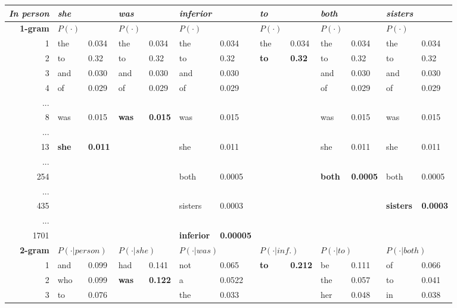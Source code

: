 \documentclass[11pt,titlepage]{article}
\begin{document}
\begin{table}
\begin{tabular}{|rllllllllllll|}
\hline
\textit{In person} & \textit{she} & & \textit{was} & & \textit{inferior} & & \textit{to} & & \textit{both} & & \textit{sisters} & \\
\hline
\textbf{1-gram} & $P(\cdot)$ & & $P(\cdot)$ & & $P(\cdot)$ & & $P(\cdot)$ & & $P(\cdot)$ & & $P(\cdot)$ & \\
1 & the & 0.034 & the & 0.034 & the & 0.034 & the & 0.034 & the & 0.034 & the & 0.034 \\
2 & to & 0.32 & to & 0.32 & to & 0.32 & \textbf{to} & \textbf{0.32} & to & 0.32 & to & 0.32 \\
3 & and & 0.030 & and & 0.030 & and & 0.030 & & & and & 0.030 & and & 0.030 \\
4 & of & 0.029 & of & 0.029 & of & 0.029 & &  & of & 0.029 & of & 0.029 \\
... & & & & & & & & & & & & \\
8 & was & 0.015  & \textbf{was} & \textbf{0.015}  & was & 0.015  & & & was & 0.015  & was & 0.015  \\
... & & & & & & & & & & & & \\
13 & \textbf{she} & \textbf{0.011} & & & she & 0.011 & & & she & 0.011 & she & 0.011 \\
... & & & & & & & & & & & & \\
254 & & & & & both & 0.0005 & & & \textbf{both} & \textbf{0.0005}  & both & 0.0005 \\
... & & & & & & & & & & & & \\ 
435 & & & & & sisters & 0.0003 & & & & & \textbf{sisters} & \textbf{0.0003} \\
... & & & & & & & & & & & & \\ 
1701 & & & & & \textbf{inferior} & \textbf{0.00005} & & & & & & \\
\hline 
\textbf{2-gram} & \multicolumn{2}{l}{$P(\cdot|person)$} & \multicolumn{2}{l}{$P(\cdot|she)$} & \multicolumn{2}{l}{$P(\cdot|was)$} & \multicolumn{2}{l}{$P(\cdot|inf.)$} & \multicolumn{2}{l}{$P(\cdot|to)$} & \multicolumn{2}{l|}{$P(\cdot|both)$}\\
1 & and & 0.099 & had & 0.141 & not & 0.065 & \textbf{to} & \textbf{0.212} & be & 0.111 & of & 0.066\\
2 & who & 0.099 & \textbf{was} & \textbf{0.122} & a & 0.0522 & & & the & 0.057 & to & 0.041\\
3 & to & 0.076 & & & the & 0.033 & & & her & 0.048 & in & 0.038\\

\end{tabular}
\end{table}
\end{document}
